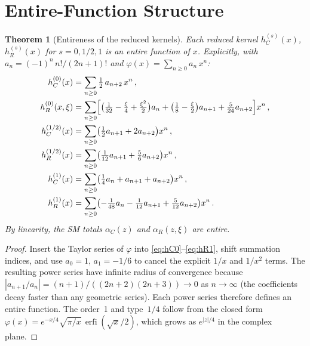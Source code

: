\documentclass[aps,prd,twocolumn,superscriptaddress,nofootinbib,floatfix]{revtex4-2}
\newtheorem{theorem}{Theorem}[section]
\theoremstyle{definition}
\theoremstyle{remark}
\newcommand{\erfi}{\operatorname{erfi}}
\begin{document}
\section{Entire-Function Structure}
\label{sec:entire}

\begin{theorem}[Entireness of the reduced kernels]
\label{thm:entire}
Each reduced kernel $h_C^{(s)}(x)$, $h_R^{(s)}(x)$ for $s = 0, 1/2, 1$ is
an entire function of $x$. Explicitly, with $a_n = (-1)^n\,n!/(2n+1)!$ and
$\varphi(x) = \sum_{n \geq 0} a_n\,x^n$:
\begin{subequations}
\label{eq:entire-series}
\begin{align}
  h_C^{(0)}(x) &= \sum_{n \geq 0}\tfrac{1}{2}\,a_{n+2}\,x^n\,,\\
  h_R^{(0)}(x,\xi) &= \sum_{n \geq 0}\Bigl[
    \bigl(\tfrac{1}{32} - \tfrac{\xi}{4} + \tfrac{\xi^2}{2}\bigr)a_n
    + \bigl(\tfrac{1}{8} - \tfrac{\xi}{2}\bigr)a_{n+1}
    + \tfrac{5}{24}a_{n+2}\Bigr]x^n\,,\\
  h_C^{(1/2)}(x) &= \sum_{n \geq 0}\bigl(
    \tfrac{1}{2}a_{n+1} + 2a_{n+2}\bigr)x^n\,,\\
  h_R^{(1/2)}(x) &= \sum_{n \geq 0}\bigl(
    \tfrac{1}{12}a_{n+1} + \tfrac{5}{6}a_{n+2}\bigr)x^n\,,\\
  h_C^{(1)}(x) &= \sum_{n \geq 0}\bigl(
    \tfrac{1}{4}a_n + a_{n+1} + a_{n+2}\bigr)x^n\,,\\
  h_R^{(1)}(x) &= \sum_{n \geq 0}\bigl(
    -\tfrac{1}{48}a_n - \tfrac{1}{12}a_{n+1}
    + \tfrac{5}{12}a_{n+2}\bigr)x^n\,.
\end{align}
\end{subequations}
By linearity, the SM totals $\alpha_C(z)$ and $\alpha_R(z,\xi)$ are entire.
\end{theorem}

\begin{proof}
Insert the Taylor series of $\varphi$ into
\eqref{eq:hC0}--\eqref{eq:hR1}, shift summation indices, and use $a_0 = 1$,
$a_1 = -1/6$ to cancel the explicit $1/x$ and $1/x^2$ terms. The resulting
power series have infinite radius of convergence because
$|a_{n+1}/a_n| = (n+1)/((2n+2)(2n+3)) \to 0$ as $n \to \infty$ (the
coefficients decay faster than any geometric series). Each power series
therefore defines an entire function. The order~1 and type~$1/4$ follow
from the closed form $\varphi(x) = e^{-x/4}\sqrt{\pi/x}\,\erfi(\sqrt{x}/2)$,
which grows as $e^{|z|/4}$ in the complex plane.
\end{proof}
\end{document}

